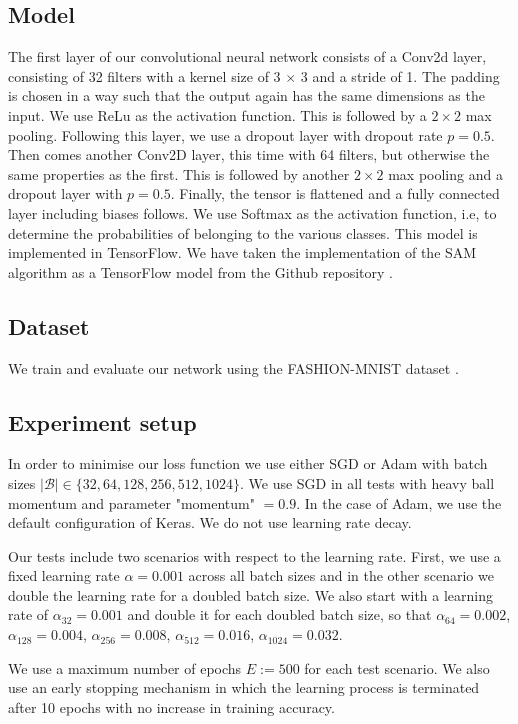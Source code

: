 \documentclass[10pt,conference,compsocconf]{IEEEtran}
\begin{document}
\subsection{Model}
The first layer of our convolutional neural network consists of a Conv2d layer, consisting of 32 filters with a kernel size of 3 $\times$ 3 and a stride of 1. The padding is chosen in a way such that the output again has the same dimensions as the input. 
We use ReLu as the activation function. 
This is followed by a $2 \times 2$ max pooling. 
Following this layer, we use a dropout layer with dropout rate $p = 0.5$.
Then comes another Conv2D layer, this time with 64 filters, but otherwise the same properties as the first. 
This is followed by another $2 \times 2$ max pooling and a dropout layer with $p = 0.5$. 
Finally, the tensor is flattened and a fully connected layer including biases follows. We use Softmax as the activation function, i.e, to determine the probabilities of belonging to the various classes. 
This model is implemented in TensorFlow. 
We have taken the implementation of the SAM algorithm as a TensorFlow model from the Github repository \cite{sam-keras}. 

\subsection{Dataset}
We train and evaluate our network using the FASHION-MNIST 
dataset \cite{fashion-mnist}. 

\subsection{Experiment setup}
In order to minimise our loss function we use either SGD or  Adam \cite{kingma2017adam} with batch sizes $|\mathcal{B}| \in \{32, 64, 128, 256, 512, 1024\}$. We use SGD in all tests with heavy ball momentum and parameter "momentum" $= 0.9$.
In the case of Adam, we use the default configuration of Keras.  
We do not use learning rate decay.

Our tests include two scenarios with respect to the learning rate. First, we use a fixed learning rate $\alpha = 0.001$ across all batch sizes and in the other scenario we double the learning rate for a doubled batch size. We also start with a learning rate of $\alpha_{32} = 0.001$ and double it for each doubled batch size, so that $\alpha_{64} = 0.002$, $\alpha_{128} = 0.004$, $\alpha_{256} = 0.008$, $\alpha_{512} = 0.016$, $\alpha_{1024} = 0.032$.

We use a maximum number of epochs $E := 500$ for each test scenario. We also use an early stopping mechanism in which the learning process is terminated after 10 epochs with no increase in training accuracy. 
\end{document}
